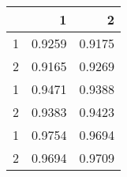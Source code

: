 \begin{tabular}{lrr}
\toprule
{} &       1 &       2 \\
\midrule
1 &  0.9259 &  0.9175 \\
2 &  0.9165 &  0.9269 \\
1 &  0.9471 &  0.9388 \\
2 &  0.9383 &  0.9423 \\
1 &  0.9754 &  0.9694 \\
2 &  0.9694 &  0.9709 \\
\bottomrule
\end{tabular}
